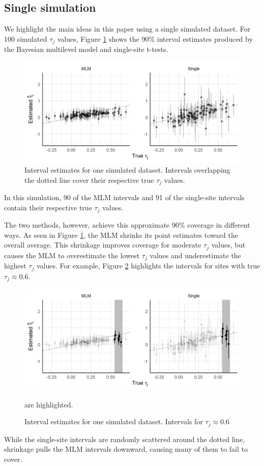 \documentclass[]{article}
\begin{document}
\subsection{Single simulation}

We highlight the main ideas in this paper using a single simulated dataset.
For 100 simulated $\tau_j$ values, Figure \ref{fig:shrinkageplot} shows the 90\% interval estimates produced by the Bayesian multilevel model and single-site t-tests.
\begin{figure}[ht]
	\centering
	\includegraphics[width=\textwidth]{shrinkageplot}
	\caption{Interval estimates for one simulated dataset. Intervals overlapping the dotted line cover their respective true $\tau_j$ values.}
	\label{fig:shrinkageplot}
\end{figure}
In this simulation, 90 of the MLM intervals and 91 of the single-site intervals contain their respective true $\tau_j$ values.

The two methods, however, achieve this approximate 90\% coverage in different ways.
As seen in Figure \ref{fig:shrinkageplot}, the MLM shrinks its point estimates toward the overall average.
This shrinkage improves coverage for moderate $\tau_j$ values, but causes the MLM to overestimate the lowest $\tau_j$ values and underestimate the highest $\tau_j$ values.
For example, Figure \ref{fig:shrinkageplot_slice1} highlights the intervals for sites with true $\tau_j \approx 0.6$.
\begin{figure}[ht]
	\centering
	\includegraphics[width=\textwidth]{shrinkageplot_slice1}
	\caption{Interval estimates for one simulated dataset. Intervals for $\tau_j \approx 0.6$} are highlighted.
	\label{fig:shrinkageplot_slice1}
\end{figure}
While the single-site intervals are randomly scattered around the dotted line, shrinkage pulls the MLM intervals downward, causing many of them to fail to cover.
\end{document}
